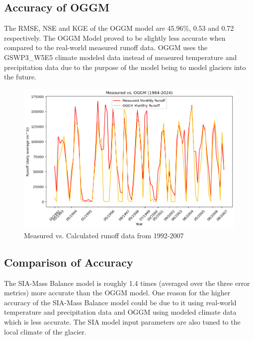 \documentclass{article}
\begin{document}
\subsection{Accuracy of OGGM}
The RMSE, NSE and KGE of the OGGM model are 45.96\%, 0.53 and 0.72 respectively. The OGGM Model proved to be slightly less accurate when 
compared to the real-world measured runoff data. OGGM uses the GSWP3\_W5E5 climate modeled data instead of measured temperature and precipitation 
data due to the purpose of the model being to model glaciers into the future.
\begin{figure}[h!]
    \centering
    \includegraphics[width=\textwidth]{Plots/oggm_vs_measured.png}
    \caption{Measured vs. Calculated runoff data from 1992-2007}
    \label{fig:oggm_vs_measured}
\end{figure}
\FloatBarrier
\subsection{Comparison of Accuracy}
The SIA-Mass Balance model is roughly 1.4 times (averaged over the three error metrics) more accurate than the OGGM model. One reason for the 
higher accuracy of the SIA-Mass Balance model could be due to it 
using real-world temperature and precipitation data and OGGM using modeled climate data which is less accurate. The SIA model input 
parameters are also tuned to the local climate of the glacier.
\end{document}
